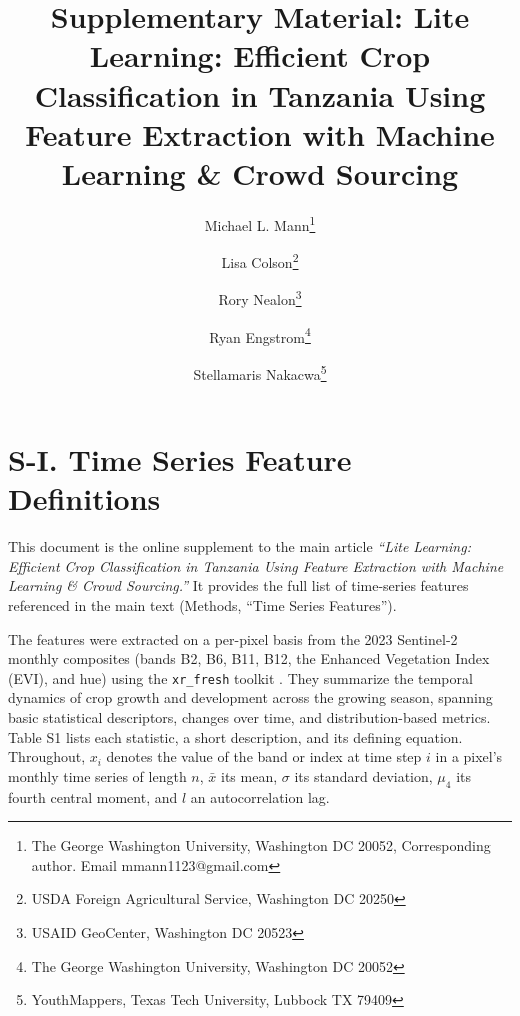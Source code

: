 \documentclass[
  journal,
  onecolumn]{IEEEtran}
\title{Supplementary Material: Lite Learning: Efficient Crop
Classification in Tanzania Using Feature Extraction with Machine
Learning \& Crowd Sourcing}
\author{
Michael L. Mann\thanks{The George Washington University, Washington DC
20052, Corresponding author. Email mmann1123@gmail.com} \and 
Lisa Colson\thanks{USDA Foreign Agricultural Service, Washington DC
20250} \and 
Rory Nealon\thanks{USAID GeoCenter, Washington DC 20523} \and 
Ryan Engstrom\thanks{The George Washington University, Washington DC
20052} \and 
Stellamaris Nakacwa\thanks{YouthMappers, Texas Tech University, Lubbock
TX 79409}}
\date{}
\begin{document}
\maketitle

\section{S-I. Time Series Feature
Definitions}\label{s-i.-time-series-feature-definitions}

This document is the online supplement to the main article \emph{``Lite
Learning: Efficient Crop Classification in Tanzania Using Feature
Extraction with Machine Learning \& Crowd Sourcing.''} It provides the
full list of time-series features referenced in the main text (Methods,
``Time Series Features'').

The features were extracted on a per-pixel basis from the 2023
Sentinel-2 monthly composites (bands B2, B6, B11, B12, the Enhanced
Vegetation Index (EVI), and hue) using the \texttt{xr\_fresh} toolkit
\citep{xr_fresh_2021}. They summarize the temporal dynamics of crop
growth and development across the growing season, spanning basic
statistical descriptors, changes over time, and distribution-based
metrics. Table S1 lists each statistic, a short description, and its
defining equation. Throughout, \(x_i\) denotes the value of the band or
index at time step \(i\) in a pixel's monthly time series of length
\(n\), \(\bar{x}\) its mean, \(\sigma\) its standard deviation,
\(\mu_4\) its fourth central moment, and \(l\) an autocorrelation lag.
\end{document}
